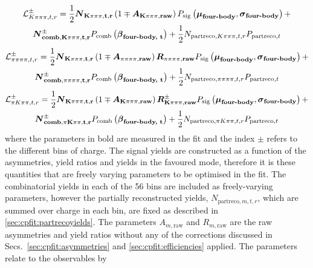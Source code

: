 \begin{multline}
\mathcal{L}_{K\pi\pi\pi, t, r}^{\pm} = \frac{1}{2}\mathbf{\boldsymbol N_{K\pi\pi\pi, t, r}}\left(1 \mp \mathbf{\boldsymbol A_{K\pi\pi\pi, raw}}\right)P_{\text{sig}}\left(\mathbf{\boldsymbol\mu_\text{\textbf{four-body}}},\mathbf{\boldsymbol\sigma_\text{\textbf{four-body}}}\right) + \\ \mathbf{\boldsymbol N_{\textbf{comb}, K\pi\pi\pi, t, r}^{\pm}}P_{\text{comb}}\left(\mathbf{\boldsymbol\beta_\text{\textbf{four-body, t}}}\right) + \frac{1}{2}N_{\text{partreco}, K\pi\pi\pi, t, r}P_{\text{partreco}, t}
\end{multline}
\begin{multline}
\mathcal{L}_{\pi\pi\pi\pi, t, r}^{\pm} = \frac{1}{2}\mathbf{\boldsymbol N_{K\pi\pi\pi, t, r}}\left(1 \mp \mathbf{\boldsymbol A_{\pi\pi\pi\pi, raw}}\right)\mathbf{\boldsymbol R_{\pi\pi\pi\pi, raw}} P_{\text{sig}}\left(\mathbf{\boldsymbol\mu_\text{\textbf{four-body}}},\mathbf{\boldsymbol\sigma_\text{\textbf{four-body}}}\right) + \\ \mathbf{\boldsymbol N_{\textbf{comb}, \pi\pi\pi\pi, t, r}^{\pm}}P_{\text{comb}}\left(\mathbf{\boldsymbol\beta_\text{\textbf{four-body, t}}}\right) + \frac{1}{2}N_{\text{partreco}, \pi\pi\pi\pi, t, r}P_{\text{partreco}, t}
\end{multline}
\begin{multline}
\mathcal{L}_{\pi K\pi\pi, t, r}^{\pm} = \frac{1}{2}\mathbf{\boldsymbol N_{K\pi\pi\pi, t, r}}\left(1 \mp \mathbf{\boldsymbol A_{K\pi\pi\pi, raw}}\right)\mathbf{\boldsymbol R_{K\pi\pi\pi, raw}^{\pm}} P_{\text{sig}}\left(\mathbf{\boldsymbol\mu_\text{\textbf{four-body}}},\mathbf{\boldsymbol\sigma_\text{\textbf{four-body}}}\right) + \\ \mathbf{\boldsymbol N_{\textbf{comb}, \pi K\pi\pi, t, r}^{\pm}}P_{\text{comb}}\left(\mathbf{\boldsymbol\beta_\text{\textbf{four-body, t}}}\right) + \frac{1}{2}N_{\text{partreco}, \pi K\pi\pi, t, r}P_{\text{partreco}, t}
\label{pikpipilikelihood}
\end{multline}
where the parameters in bold are measured in the fit and the index $\pm$ refers to the different bins of \B charge. The signal yields are constructed as a function of the asymmetries, yield ratios and yields in the favoured mode, therefore it is these quantities that are freely varying parameters to be optimised in the \CP fit. The combinatorial yields in each of the 56 bins are included as freely-varying parameters, however the partially reconstructed yields, $N_{\text{partreco}, m, t, r}$, which are summed over charge in each bin, are fixed as described in \sect\ref{sec:cpfit:partrecoyields}. The parameters $A_{m, \text{raw}}$ and $R_{m, \text{raw}}$ are the raw asymmetries and yield ratios without any of the corrections discussed in Secs.~\ref{sec:cpfit:asymmetries} and \ref{sec:cpfit:efficiencies} applied. The parameters relate to the \CP observables by
